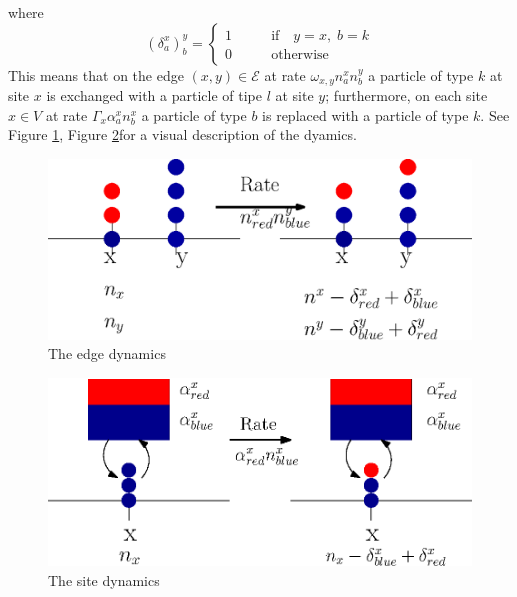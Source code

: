 \documentclass[11pt]{article}
\numberwithin{equation}{section}
\numberwithin{equation}{subsection}
\begin{document}
where 
\begin{equation}
(\delta_{a}^{x})^{y}_{b}=\begin{cases}
1\qquad &\text{if}\quad y=x,\;b=k\\
0\qquad &\text{otherwise}
\end{cases}
\end{equation}
This means that on the edge $(x,y)\in \mathcal{E}$ at rate $\omega_{x,y}n_{a}^{x}n_{b}^{y}$ a particle of type $k$ at site $x$ is exchanged with a particle of tipe $l$ at site $y$; furthermore, on each site $x\in V$ at rate $\Gamma_{x}\alpha_{a}^{x}n_{b}^{x}$ a particle of type $b$ is replaced with a particle of type $k$. 
See Figure \ref{fig:1}, Figure \ref{fig:2}for a visual description of the dyamics. 
\begin{figure}
    \centering
    \includegraphics[scale=0.6]{Dyn_stir.eps}
    \caption{The edge dynamics}
    \label{fig:1}
\end{figure}
\begin{figure}
    \centering
    \includegraphics[scale=0.88]{Dyn_stir_bordo.eps}
    \caption{The site dynamics}
    \label{fig:2}
\end{figure}
\end{document}

